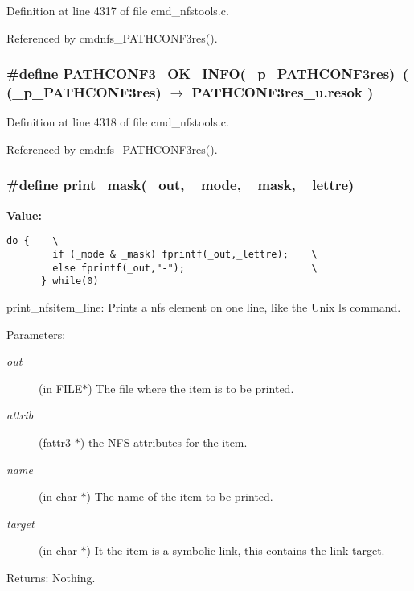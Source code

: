 Definition at line 4317 of file cmd\_\-nfstools.c.

Referenced by cmdnfs\_\-PATHCONF3res().
\subsubsection{\setlength{\rightskip}{0pt plus 5cm}\#define PATHCONF3\_\-OK\_\-INFO(\_\-p\_\-PATHCONF3res)\ ( (\_\-p\_\-PATHCONF3res) $\rightarrow$ PATHCONF3res\_\-u.resok )}\label{cmd__nfstools_8c_a55}




Definition at line 4318 of file cmd\_\-nfstools.c.

Referenced by cmdnfs\_\-PATHCONF3res().
\subsubsection{\setlength{\rightskip}{0pt plus 5cm}\#define print\_\-mask(\_\-out, \_\-mode, \_\-mask, \_\-lettre)}\label{cmd__nfstools_8c_a57}


{\bf Value:}

\footnotesize\begin{verbatim}do {    \
        if (_mode & _mask) fprintf(_out,_lettre);    \
        else fprintf(_out,"-");                      \
      } while(0)
\end{verbatim}\normalsize 
print\_\-nfsitem\_\-line: Prints a nfs element on one line, like the Unix ls command.

\begin{Desc}
\item[Parameters:]
\begin{description}
\item[{\em out}](in FILE$\ast$) The file where the item is to be printed. \item[{\em attrib}](fattr3 $\ast$) the NFS attributes for the item. \item[{\em name}](in char $\ast$) The name of the item to be printed. \item[{\em target}](in char $\ast$) It the item is a symbolic link, this contains the link target. \end{description}
\end{Desc}
\begin{Desc}
\item[Returns:]Nothing. \end{Desc}


